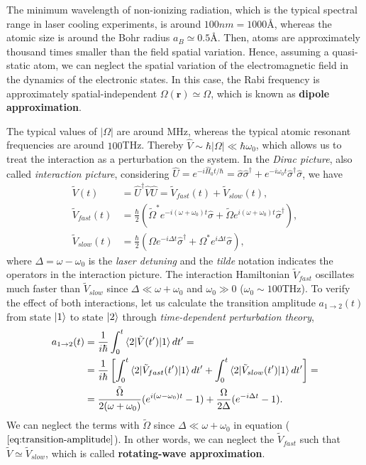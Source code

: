 The minimum wavelength of non-ionizing radiation, which is the typical spectral range in laser cooling experiments, is around $100 nm = 1000 \textrm{\AA} $, whereas the atomic size is around the Bohr radius $ a_B \simeq 0.5 $\AA. Then, atoms are approximately thousand times smaller than the field spatial variation. Hence, assuming a quasi-static atom, we can neglect the spatial variation of the electromagnetic field in the dynamics of the electronic states. In this case, the Rabi frequency is approximately spatial-independent $ \Omega(\mathbf{r}) \simeq \Omega $, which is known as \textbf{dipole approximation}.

The typical values of $ |\Omega| $ are around MHz, whereas the typical atomic resonant frequencies are around $100$THz. Thereby $ \hat{V} \sim \hbar |\Omega| \ll \hbar \omega_0 $, which allows us to treat the interaction as a perturbation on the system. In the \textit{Dirac picture}, also called \textit{interaction picture}, considering $ \hat{U} = e^{-i \hat{H}_0 t / \hbar} = \hat{\sigma}\hat{\sigma}^{\dagger} + e^{-i\omega_0 t} \hat{\sigma}^{\dagger}\hat{\sigma}$, we have
\begin{align}
	\tilde{V}(t) &= \hat{U}^{\dagger} \hat{V} \hat{U} = \tilde{V}_{fast}(t) + \tilde{V}_{slow}(t), \\
	\tilde{V}_{fast}(t) &= \frac{\hbar}{2}(\tilde{\Omega}^* e^{-i(\omega + \omega_0)t} \hat{\sigma} + \tilde{\Omega}e^{i(\omega + \omega_0)t} \hat{\sigma}^{\dagger}), \\
	\tilde{V}_{slow}(t) &= \frac{\hbar}{2}(\Omega e^{-i \Delta t} \hat{\sigma}^{\dagger} + \Omega^{*}e^{i \Delta t} \hat{\sigma}),
	\label{eq:interaction-Hamiltonian-Dirac-picture}
\end{align}
where $ \Delta = \omega - \omega_0 $ is the \textit{laser detuning} and the \textit{tilde} notation indicates the operators in the interaction picture. The interaction Hamiltonian $ \tilde{V}_{fast} $ oscillates much faster than $ \tilde{V}_{slow} $ since $ \Delta \ll \omega + \omega_0 $ and $ \omega_0 \gg 0 $ ($ \omega_0 \sim 100$THz). To verify the effect of both interactions, let us calculate the transition amplitude $a_{1 \rightarrow 2}(t) $ from state $ \ket{1} $ to state $ \ket{2} $ through \textit{time-dependent perturbation theory},
\begin{align}
	a_{1 \rightarrow 2}(t) &= \frac{1}{i\hbar} \int_{0}^{t} \braket{2|\tilde{V}(t')|1} dt' =\\
	&= \frac{1}{i\hbar} \left[ \int_{0}^{t} \braket{2|\tilde{V}_{fast}(t')|1} dt' + \int_{0}^{t} \braket{2|\tilde{V}_{slow}(t')|1} dt' \right] =\\
	&= \frac{\tilde{\Omega}}{2(\omega + \omega_0)}(e^{i(\omega - \omega_0)t} - 1) + \frac{\Omega}{2\Delta}(e^{-i\Delta t} - 1).
	\label{eq:transition-amplitude}
\end{align}
We can neglect the terms with $ \tilde{\Omega} $ since $ \Delta \ll \omega + \omega_0 $ in equation ($ \ref{eq:transition-amplitude} $). In other words, we can neglect the $ \tilde{V}_{fast} $ such that $ \tilde{V} \simeq \tilde{V}_{slow} $, which is called \textbf{rotating-wave approximation}.

